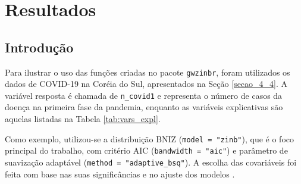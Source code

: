 \documentclass[12pt, a4paper, twoside]{report}
\numberwithin{equation}{section} %
\begin{document}



\chapter{Resultados}\label{capitulo_6}

\section{Introdução}

Para ilustrar o uso das funções criadas no pacote \texttt{gwzinbr}, foram utilizados os dados de COVID-19 na Coréia do Sul, apresentados na Seção \ref{secao_4_4}. A variável resposta é chamada de \texttt{n\_covid1} e representa o número de casos da doença na primeira fase da pandemia, enquanto as variáveis explicativas são aquelas listadas na Tabela \ref{tab:vars_expl}.

Como exemplo, utilizou-se a distribuição BNIZ (\texttt{model = "zinb"}), que é o foco principal do trabalho, com critério AIC (\texttt{bandwidth = "aic"}) e parâmetro de suavização adaptável (\texttt{method = "adaptive\_bsq"}). A escolha das covariáveis foi feita com base nas suas significâncias e no ajuste dos modelos \citep{sousa2022}.
\end{document}
